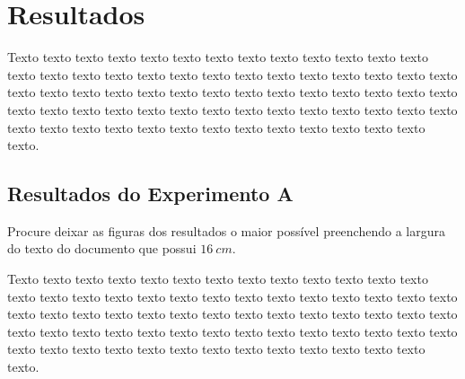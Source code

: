 \chapter{Resultados}
\label{chap:resultados}

Texto texto texto texto texto texto texto texto texto texto texto texto texto texto texto texto texto texto texto texto texto texto texto texto texto texto texto texto texto texto texto texto texto texto texto texto texto texto texto texto texto texto texto texto texto texto texto texto texto texto texto texto texto texto texto texto texto texto texto texto texto texto texto texto texto texto texto texto texto.

\section{Resultados do Experimento A}
\label{sec:resultados-do-experimento-a}

Procure deixar as figuras dos resultados o maior possível preenchendo a largura do texto do documento que possui $16~cm$.

\begin{figure}[h!]
        \captionsetup{width=16cm}
\end{figure}

Texto texto texto texto texto texto texto texto texto texto texto texto texto texto texto texto texto texto texto texto texto texto texto texto texto texto texto texto texto texto texto texto texto texto texto texto texto texto texto texto texto texto texto texto texto texto texto texto texto texto texto texto texto texto texto texto texto texto texto texto texto texto texto texto texto texto texto texto texto.

